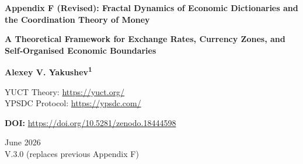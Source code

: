 \documentclass[12pt,a4paper]{article}
\theoremstyle{remark}
\begin{document}
	
	\begin{titlepage}
		\centering
		\vspace*{1cm}
		
		\Huge\textbf{Appendix F (Revised): Fractal Dynamics of Economic Dictionaries and the Coordination Theory of Money}
		
		\vspace{0.5cm}
		\Large\textbf{A Theoretical Framework for Exchange Rates, Currency Zones, and Self‑Organised Economic Boundaries}
		
		\vspace{1.5cm}
		
		\Large\textbf{Alexey V. Yakushev\textsuperscript{1}}
		
		YUCT Theory: \url{https://yuct.org/}\\
		YPSDC Protocol: \url{https://ypsdc.com/}
		
		\vspace{2cm}
		\textbf{DOI:} \url{https://doi.org/10.5281/zenodo.18444598}
		
		\vspace{1cm}
		
		\large
		June 2026 \\ \large V.3.0 (replaces previous Appendix F)
		
		\vspace{2cm}
		

\end{titlepage}
\end{document}
